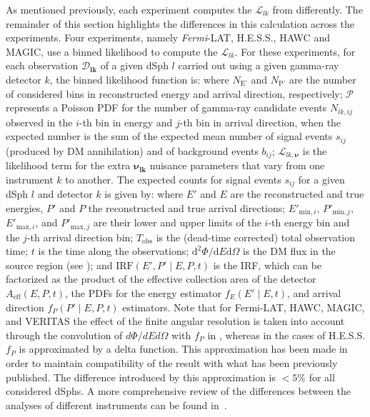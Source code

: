 As mentioned previously, each experiment computes the $\mathcal{L}_{lk}$ from  differently.
The remainder of this section highlights the differences in this calculation across the experiments.
Four experiments, namely \textit{Fermi}-LAT, H.E.S.S., HAWC and MAGIC, use a binned likelihood to compute the $\mathcal{L}_{lk}$.
For these experiments, for each observation $\bm{\mathcal{D}_{lk}}$ of a given dSph $l$ carried out using a given gamma-ray detector $k$, the binned likelihood function is:
\gdJointLLH
where $N_{\text{E'}}$ and $N_{\text{P'}}$ are the number of considered bins in reconstructed energy and arrival direction, respectively; $\mathcal{P}$ represents a Poisson PDF for the number of gamma-ray candidate events $ N_{lk,ij} $ observed in the $i$-th bin in energy and $j$-th bin in arrival direction, when the expected number is the sum of the expected mean number of signal events $ s_{ij} $ (produced by DM annihilation) and of background events $ b_{ij} $; $ \mathcal{L}_{lk,\bm{\nu}} $ is the likelihood term for the extra $ \bm{\nu_{lk}} $ nuisance parameters that vary from one instrument $k$ to another.
The expected counts for signal events $s_{ij}$ for a given dSph $l$ and detector $k$ is given by:
\gdExpectedNS
where $ E' $ and $ E $ are the reconstructed and true energies, $ P' $ and $ P $ the reconstructed and true arrival directions; $ E'_{\text{min},i} $, $ P'_{\text{min},j} $, $ E'_{\text{max},i} $, and $ P'_{\text{max},j} $ are their lower and upper limits of the $ i $-th energy bin and the $ j $-th arrival direction bin; $ T_{\text{obs}} $ is the (dead-time corrected) total observation time; $ t $ is the time along the observations; $ \text{d}^{2}\Phi/\text{d}E\text{d}\Omega $ is the DM flux in the source region (see );
and $ \text{IRF} \left( E', P' \mid E, P, t \right) $ is the IRF, which can be factorized as the product of the effective collection area of the detector $ A_{\mathrm{eff}} (E, P, t) $, the PDFs for the energy estimator $ f_{E} (E' \mid E,t) $, and arrival direction $ f_{P} (P' \mid E,P,t) $ estimators.
Note that for Fermi-LAT, HAWC, MAGIC, and VERITAS the effect of the finite angular resolution is taken into account through the convolution of $d\Phi/dE d\Omega$ with $f_{P}$ in , whereas in the cases of H.E.S.S. $f_{P}$ is approximated by a delta function.
This approximation has been made in order to maintain compatibility of the result with what has been previously published.
The difference introduced by this approximation is $<5\%$ for all considered dSphs.
A more comprehensive review of the differences between the analyses of different instruments can be found in~\cite{2020Galax...8...25R}.

